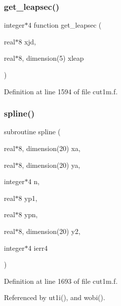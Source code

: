 \subsubsection{\texorpdfstring{get\+\_\+leapsec()}{get\_leapsec()}}
{\footnotesize\ttfamily integer$\ast$4 function get\+\_\+leapsec (\begin{DoxyParamCaption}\item[{real$\ast$8}]{xjd,  }\item[{real$\ast$8, dimension(5)}]{xleap }\end{DoxyParamCaption})}



Definition at line 1594 of file cut1m.\+f.

\mbox{\label{cut1m_8f_a86702ff457c343d1d2eb7d4bdc1d9671}} 
\subsubsection{\texorpdfstring{spline()}{spline()}}
{\footnotesize\ttfamily subroutine spline (\begin{DoxyParamCaption}\item[{real$\ast$8, dimension(20)}]{xa,  }\item[{real$\ast$8, dimension(20)}]{ya,  }\item[{integer$\ast$4}]{n,  }\item[{real$\ast$8}]{yp1,  }\item[{real$\ast$8}]{ypn,  }\item[{real$\ast$8, dimension(20)}]{y2,  }\item[{integer$\ast$4}]{ierr4 }\end{DoxyParamCaption})}



Definition at line 1693 of file cut1m.\+f.



Referenced by ut1i(), and wobi().

\mbox{\label{cut1m_8f_aa9fa0903230955ebe5f1866b735fe449}} 
